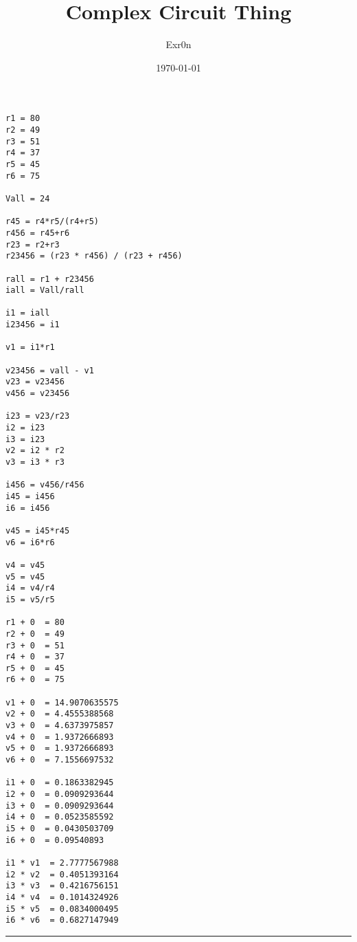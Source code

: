 \documentclass[letterpaper]{article}
\author{Exr0n}
\date{\today}
\title{Complex Circuit Thing}
\renewcommand{\tableofcontents}{}
\begin{document}
\tableofcontents

\begin{verbatim}
r1 = 80
r2 = 49
r3 = 51
r4 = 37
r5 = 45
r6 = 75

Vall = 24

r45 = r4*r5/(r4+r5)
r456 = r45+r6
r23 = r2+r3
r23456 = (r23 * r456) / (r23 + r456)

rall = r1 + r23456
iall = Vall/rall

i1 = iall
i23456 = i1

v1 = i1*r1

v23456 = vall - v1
v23 = v23456
v456 = v23456

i23 = v23/r23
i2 = i23
i3 = i23
v2 = i2 * r2
v3 = i3 * r3

i456 = v456/r456
i45 = i456
i6 = i456

v45 = i45*r45
v6 = i6*r6

v4 = v45
v5 = v45
i4 = v4/r4
i5 = v5/r5

r1 + 0  = 80
r2 + 0  = 49
r3 + 0  = 51
r4 + 0  = 37
r5 + 0  = 45
r6 + 0  = 75

v1 + 0  = 14.9070635575
v2 + 0  = 4.4555388568
v3 + 0  = 4.6373975857
v4 + 0  = 1.9372666893
v5 + 0  = 1.9372666893
v6 + 0  = 7.1556697532

i1 + 0  = 0.1863382945
i2 + 0  = 0.0909293644
i3 + 0  = 0.0909293644
i4 + 0  = 0.0523585592
i5 + 0  = 0.0430503709
i6 + 0  = 0.09540893

i1 * v1  = 2.7777567988
i2 * v2  = 0.4051393164
i3 * v3  = 0.4216756151
i4 * v4  = 0.1014324926
i5 * v5  = 0.0834000495
i6 * v6  = 0.6827147949
\end{verbatim}

\noindent\rule{\textwidth}{0.5pt}
\end{document}
